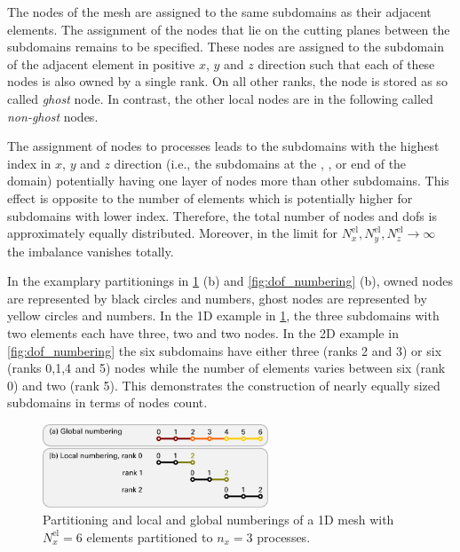 The nodes of the mesh are assigned to the same subdomains as their adjacent elements. 
The assignment of the nodes that lie on the cutting planes between the subdomains remains to be specified. These nodes are assigned to the subdomain of the adjacent element in positive $x$, $y$ and $z$ direction such that each of these nodes is also owned by a single rank. On all other ranks, the node is stored as so called \emph{ghost} node. In contrast, the other local nodes are in the following called \emph{non-ghost} nodes.

The assignment of nodes to processes leads to the subdomains with the highest index in $x$, $y$ and $z$ direction (i.e., the subdomains at the , , or  end of the domain) potentially having one layer of nodes more than other subdomains. This effect is opposite to the number of elements which is potentially higher for subdomains with lower index. Therefore, the total number of nodes and dofs is  approximately equally distributed. Moreover, in the limit for $N^\text{el}_x,N^\text{el}_y,N^\text{el}_z \to \infty$ the imbalance vanishes totally. 

In the examplary partitionings in \cref{fig:1d_nodes} (b) and \cref{fig:dof_numbering} (b), owned nodes are represented by black circles and numbers, ghost nodes are represented by yellow circles and numbers. In the 1D example in \cref{fig:1d_nodes}, the three subdomains with two elements each have three, two and two nodes. In the 2D example in \cref{fig:dof_numbering} the six subdomains have either three (ranks 2 and 3) or six (ranks 0,1,4 and 5) nodes while the number of elements varies between six (rank 0) and two (rank 5). This demonstrates the construction of nearly equally sized subdomains in terms of nodes count.

\begin{figure}%
  \centering%
  \includegraphics[width=0.6\textwidth]{images/implementation/1d_nodes.pdf}%
  \caption{Partitioning and local and global numberings of a 1D mesh with $N^\text{el}_x=6$ elements partitioned to $n_x=3$ processes.}%
  \label{fig:1d_nodes}%
\end{figure}%

